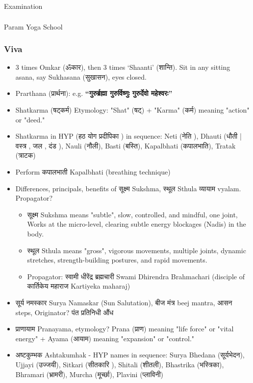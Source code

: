 \begin{frame}[fragile]\frametitle{}
\begin{center}
{\Large Examination}
\end{center}
\end{frame}

\begin{frame}[fragile]\frametitle{}
\begin{center}
{\Large Param Yoga School}
\end{center}
\end{frame}

\begin{frame}[fragile]\frametitle{Viva}
	\begin{itemize}
    \item 3 times Omkar (ॐकार), then 3 times ‘Shaanti’ (शान्ति). Sit in any sitting asana, say Sukhasana (सुखासन), eyes closed.
    \item Prarthana (प्रार्थना): e.g. \textbf{“गुरुर्ब्रह्मा गुरुर्विष्णुः गुरुर्देवो महेश्वरः”}
	\item Shatkarma (षट्कर्म) Etymology: "Shat" (षट्) + "Karma" (कर्म) meaning "action" or "deed."
	\item Shatkarma in HYP (हठ योग प्रदीपिका ) in sequence: Neti (नेति ), Dhauti (धौती | वस्त्र ,  जल ,  दंड ),  Nauli (नौली), Basti (बस्ति), Kapalbhati (कपालभाति), Tratak (त्राटक)
	\item Perform कपालभाती Kapalbhati (breathing technique)
	\item Differences, principals, benefits of सूक्ष्म  Sukshma, स्थूल Sthula व्यायाम vyalam. Propagator?
		\begin{itemize}
			\item सूक्ष्म Sukshma means "subtle", slow, controlled, and mindful, one joint, Works at the micro-level, clearing subtle energy blockages (Nadis) in the body.
			\item स्थूल Sthula means "gross", vigorous movements, multiple joints, dynamic stretches, strength-building postures, and rapid movements.
			\item Propagator: स्वामी धीरेंद्र ब्रह्मचारी  Swami Dhirendra Brahmachari  (disciple of कार्तिकेय महाराज  Kartiyeka maharaj)
		\end{itemize}
	\item सूर्य नमस्कार Surya Namaskar (Sun Salutation), बीज मंत्र  beej mantra, आसन steps, Originator? पंत प्रतिनिधी औंध 
	\item प्राणायाम  Pranayama, etymology? Prana (प्राण) meaning "life force" or "vital energy" + Ayama (आयाम) meaning "expansion" or "control."
	\item अष्टकुम्भक  Ashtakumhak - HYP names in sequence: Surya Bhedana (सूर्यभेदन), Ujjayi (उज्जयी), Sitkari (सीतकारि ), Shitali (शीतली), Bhastrika (भस्त्रिका), Bhramari (भ्रामरी), Murcha (मूर्च्छा), Plavini (प्लाविनी)
	\end{itemize}
\end{frame}

